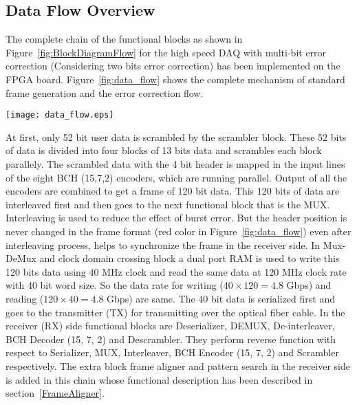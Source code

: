 \documentclass[10pt, conference, compsocconf]{IEEEtran}
\begin{document}
\subsection{Data Flow Overview}
 The complete chain of the functional blocks as shown in Figure~\ref{fig:BlockDiagramFlow} for the high speed DAQ with multi-bit error correction (Considering two bits error correction) has been implemented on the FPGA board. Figure~\ref{fig:data_flow} shows the complete mechanism of standard frame generation and the error correction flow.
\begin{figure*}[htb]
\centering
\texttt{[image: data\_flow.eps]}
\vspace{-10 pt}
\caption{Standard frame generation and Error correction flow}
\label{fig:data_flow}
\vspace{-15 pt}
\end{figure*}
 At first, only 52 bit user data is scrambled by the scrambler block. These 52 bits of data is divided into four blocks of 13 bits data and scrambles each block parallely. The scrambled data with the 4 bit header is mapped in the input lines of the eight BCH (15,7,2) encoders, which are running parallel.  Output of all the encoders are combined to get a frame of 120 bit data. This 120 bits of data are interleaved first and then goes to the next functional block that is the MUX. Interleaving is used to reduce the effect of burst error. But the header position is never changed in the frame format (red color in Figure~\ref{fig:data_flow}) even after interleaving process, helps to synchronize the frame in the receiver side. In Mux-DeMux and clock domain crossing block a dual port RAM is used to write this 120 bits data using 40 MHz clock and read the same data at 120 MHz clock rate with 40 bit word size. So the data rate for writing ($40 \times 120=4.8 $ Gbps) and reading ($120\times 40=4.8$ Gbps) are same. The 40 bit data is serialized first and goes to the transmitter (TX) for transmitting over the optical fiber cable. In the receiver (RX) side functional blocks are Deserializer, DEMUX, De-interleaver, BCH Decoder (15, 7, 2) and Descrambler. They perform reverse function with respect to Serializer, MUX, Interleaver, BCH Encoder (15, 7, 2) and Scrambler respectively. The extra block frame aligner and pattern search in the receiver side is added in this chain whose functional description has been described in section~\ref{FrameAligner}.



\iffalse.Figure~\ref{fig:FrameAlignerWork} shows how this block works.\fi   
\end{document}
